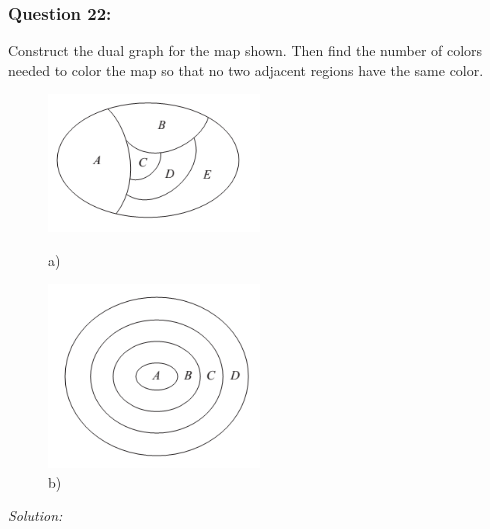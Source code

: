 \documentclass[a4paper]{article}
\begin{document}
	\subsubsection*{Question 22:}
	Construct the dual graph for the map shown. Then find the number of colors needed to color the map so that no two adjacent regions have the same color.
	\begin{figure}[H]
		\begin{minipage}{0.5\textwidth}
			\centering
			\includegraphics[width=0.5\textwidth]{tut922_1.png}
			\caption*{a)}
		\end{minipage}
		\begin{minipage}{0.5\textwidth}
			\centering
			\includegraphics[width=0.5\textwidth]{tut922_2.png}
			\caption*{b)}
		\end{minipage}
	\end{figure}
	\textit{Solution:}\\
\end{document}
